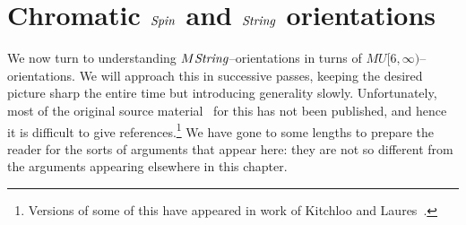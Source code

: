 \section{Chromatic \texorpdfstring{$\mathit{Spin}$}{Spin} and \texorpdfstring{$\mathit{String}$}{String} orientations}

We now turn to understanding $M\mathit{String}$--orientations in turns of $MU[6, \infty)$--orientations.  We will approach this in successive passes, keeping the desired picture sharp the entire time but introducing generality slowly.  Unfortunately, most of the original source material~\cite{HAS,StricklandFSKS} for this has not been published, and hence it is difficult to give references.\footnote{Versions of some of this have appeared in work of Kitchloo and Laures~\cite{KitchlooLaures}.}  We have gone to some lengths to prepare the reader for the sorts of arguments that appear here: they are not so different from the arguments appearing elsewhere in this chapter.

